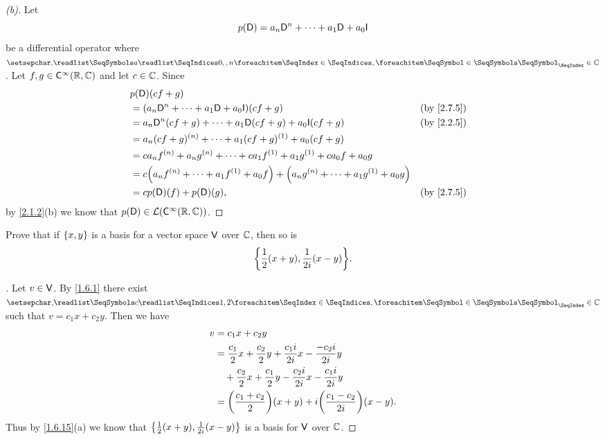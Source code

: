 \begin{proof}[(b)]
	Let
	\[
		p(\Dop) = a_n \Dop^n + \cdots + a_1 \Dop + a_0 \IT
	\]
	be a differential operator where \(\seq{a}{0,,n} \in \C\).
	Let \(f, g \in \cfs[\infty](\R, \C)\) and let \(c \in \mathbb{C}\).
	Since
	\begin{align*}
		 & p(\Dop)(cf + g)                                                                                                       \\
		 & = \pa{a_n \Dop^n + \cdots + a_1 \Dop + a_0 \IT}(cf + g)                                               &  & \by{2.7.5} \\
		 & = a_n \Dop^n(cf + g) + \cdots + a_1 \Dop(cf + g) + a_0 \IT(cf + g)                                    &  & \by{2.2.5} \\
		 & = a_n (cf + g)^{(n)} + \cdots + a_1 (cf + g)^{(1)} + a_0 (cf + g)                                                     \\
		 & = c a_n f^{(n)} + a_n g^{(n)} + \cdots + c a_1 f^{(1)} + a_1 g^{(1)} + c a_0 f + a_0 g                                \\
		 & = c \pa{a_n f^{(n)} + \cdots + a_1 f^{(1)} + a_0 f} + \pa{a_n g^{(n)} + \cdots + a_1 g^{(1)} + a_0 g}                 \\
		 & = c p(\Dop)(f) + p(\Dop)(g),                                                                          &  & \by{2.7.5}
	\end{align*}
	by \cref{2.1.2}(b) we know that \(p(\Dop) \in \ls(\cfs[\infty](\R, \C))\).
\end{proof}

\begin{ex}\label{ex:2.7.7}
	Prove that if \(\left\lbrace x, y\right\rbrace\) is a basis for a vector space \(\mathsf{V}\) over \(\mathbb{C}\), then so is
	\[
		\set{\frac{1}{2} (x + y), \frac{1}{2i} (x - y)}.
	\]
\end{ex}

\begin{proof}[]
	Let \(v \in \mathsf{V}\).
	By \cref{1.6.1} there exist \(\seq{c}{1,2} \in \C\) such that \(v = c_1 x + c_2 y\).
	Then we have
	\begin{align*}
		v & = c_1 x + c_2 y                                                                      \\
		  & = \frac{c_1}{2} x + \frac{c_2}{2} y + \frac{c_1 i}{2 i} x - \frac{-c_2 i}{2 i} y     \\
		  & \quad + \frac{c_2}{2} x + \frac{c_1}{2} y - \frac{c_2 i}{2 i} x - \frac{c_1 i}{2i} y \\
		  & = \pa{\frac{c_1 + c_2}{2}} (x + y) + i \pa{\frac{c_1 - c_2}{2i}} (x - y).
	\end{align*}
	Thus by \cref{1.6.15}(a) we know that \(\left\lbrace\frac{1}{2} (x + y), \frac{1}{2i} (x - y)\right\rbrace\) is a basis for \(\mathsf{V}\) over \(\mathbb{C}\).
\end{proof}

